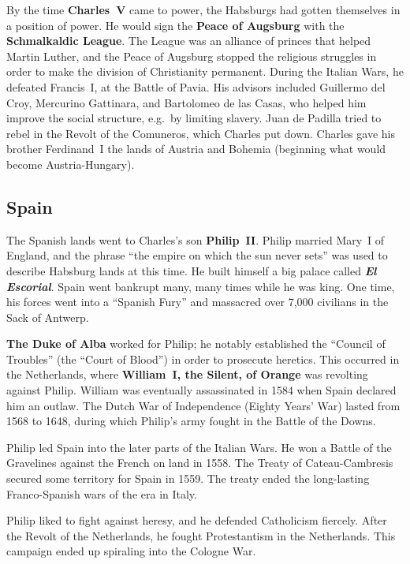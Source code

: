 By the time \textbf{Charles~V} came to power, the Habsburgs had gotten themselves in a position of power.
He would sign the \textbf{Peace of Augsburg} with the \textbf{Schmalkaldic League}.
The League was an alliance of princes that helped Martin Luther,
and the Peace of Augsburg stopped the religious struggles in order to make the division of Christianity permanent.
During the Italian Wars, he defeated Francis~I, at the Battle of Pavia.
His advisors included Guillermo del Croy, Mercurino Gattinara, and Bartolomeo de las Casas,
who helped him improve the social structure, e.g.\ by limiting slavery.
Juan de Padilla tried to rebel in the Revolt of the Comuneros, which Charles put down.
Charles gave his brother Ferdinand~I the lands of Austria and Bohemia (beginning what would become Austria-Hungary).

\subsection*{Spain}

The Spanish lands went to Charles's son \textbf{Philip~II}.
Philip married Mary~I of England, and the phrase ``the empire on which the sun never sets''
was used to describe Habsburg lands at this time.
He built himself a big palace called \textbf{\textit{El Escorial}}.
Spain went bankrupt many, many times while he was king.
One time, his forces went into a ``Spanish Fury'' and massacred over 7,000 civilians in the Sack of Antwerp.

\textbf{The Duke of Alba} worked for Philip;
he notably established the ``Council of Troubles'' (the ``Court of Blood'') in order to prosecute heretics.
This occurred in the Netherlands, where \textbf{William~I, the Silent, of Orange} was revolting against Philip.
William was eventually assassinated in 1584 when Spain declared him an outlaw.
The Dutch War of Independence (Eighty Years' War) lasted from 1568 to 1648,
during which Philip's army fought in the Battle of the Downs.

Philip led Spain into the later parts of the Italian Wars.
He won a Battle of the Gravelines against the French on land in 1558.
The Treaty of Cateau-Cambresis secured some territory for Spain in 1559.
The treaty ended the long-lasting Franco-Spanish wars of the era in Italy.

Philip liked to fight against heresy, and he defended Catholicism fiercely.
After the Revolt of the Netherlands, he fought Protestantism in the Netherlands.
This campaign ended up spiraling into the Cologne War.

